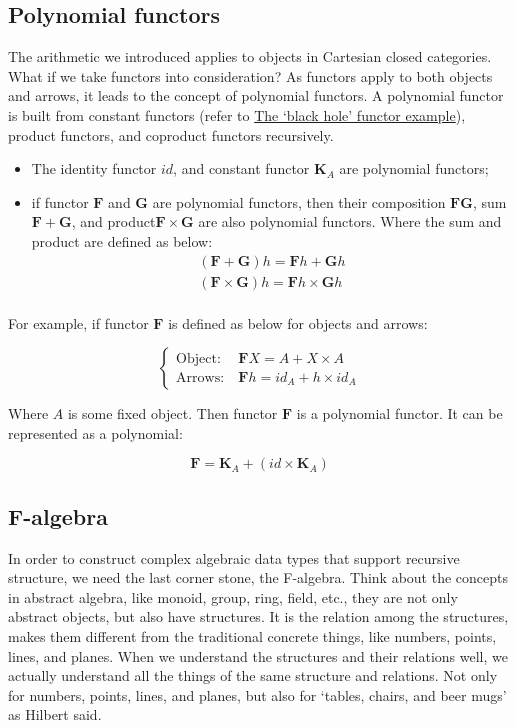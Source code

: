 \documentclass{article}
\begin{document}
\subsection{Polynomial functors}
\label{sec:polynomial-functors}

The arithmetic we introduced applies to objects in Cartesian closed categories. What if we take functors into consideration? As functors apply to both objects and arrows, it leads to the concept of polynomial functors. A polynomial functor is built from constant functors (refer to \hyperref[sec:functor:examples]{The `black hole' functor example}), product functors, and coproduct functors recursively.

\begin{itemize}
  \item The identity functor $id$, and constant functor $\mathbf{K}_A$ are polynomial functors;
  \item if functor $\mathbf{F}$ and $\mathbf{G}$ are polynomial functors, then their composition $\mathbf{FG}$, sum $\mathbf{F} + \mathbf{G}$, and product$\mathbf{F} \times \mathbf{G}$ are also polynomial functors. Where the sum and product are defined as below:
  \[
    \begin{array}{l}
    (\mathbf{F} + \mathbf{G}) h = \mathbf{F} h + \mathbf{G} h \\
    (\mathbf{F} \times \mathbf{G}) h = \mathbf{F} h \times \mathbf{G} h \\
    \end{array}
  \]
\end{itemize}

For example, if functor $\mathbf{F}$ is defined as below for objects and arrows:

\[
\begin{cases}
\text{Object:}\ & \mathbf{F} X = A + X \times A \\
\text{Arrows:}\ & \mathbf{F} h = id_A + h \times id_A
\end{cases}
\]

Where $A$ is some fixed object. Then functor $\mathbf{F}$ is a polynomial functor. It can be represented as a polynomial:

\[
\mathbf{F} = \mathbf{K}_A + (id \times \mathbf{K}_A)
\]

\subsection{F-algebra}

In order to construct complex algebraic data types that support recursive structure, we need the last corner stone, the F-algebra. Think about the concepts in abstract algebra, like monoid, group, ring, field, etc., they are not only abstract objects, but also have structures. It is the relation among the structures, makes them different from the traditional concrete things, like numbers, points, lines, and planes. When we understand the structures and their relations well, we actually understand all the things of the same structure and relations. Not only for numbers, points, lines, and planes, but also for `tables, chairs, and beer mugs' as Hilbert said.
\end{document}
